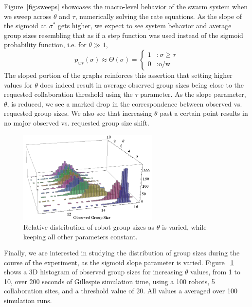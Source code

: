 \documentclass[Main.tex]{subfiles}
\begin{document}
Figure~\ref{fig:sweeps} showcases the macro-level behavior of the swarm system when we sweep across $\theta$ and $\tau$, numerically solving the rate equations. As the slope of the sigmoid at $\sigma^*$ gets higher, we expect to see system behavior and average group sizes resembling that as if a step function was used instead of the sigmoid probability function, i.e. for $\theta \gg 1$, 
\begin{equation*}
p_{ws}(\sigma) \approx \Theta(\sigma) = \left\{
\begin{array}{rl}
1 & : \sigma \geq \tau\\
0 & : \text{o/w}
\end{array}\right.
\end{equation*}
The sloped portion of the graphs reinforces this assertion that setting higher values for $\theta$ does indeed result in average observed group sizes being close to the requested collaboration threshold using the $\tau$ parameter. As the slope parameter, $\theta$, is reduced, we see a marked drop in the correspondence between observed vs. requested group sizes. We also see that increasing $\theta$ past a certain point results in no major observed vs. requested group size shift.

\begin{figure}[!tp]
\centering\includegraphics[width=7cm]{distsweep.png}
\caption{Relative distribution of robot group sizes as $\theta$ is varied, while keeping all other parameters constant.}\label{fig:var}
\end{figure}

Finally, we are interested in studying the distribution of group sizes during the course of the experiment, as the sigmoid slope parameter is varied. Figure ~\ref{fig:var} shows a 3D histogram of observed group sizes for increasing $\theta$ values, from 1 to 10, over 200 seconds of Gillespie simulation time, using a 100 robots, 5 collaboration sites, and a threshold value of 20. All values a averaged over 100 simulation runs.
\end{document}
